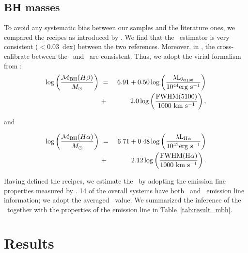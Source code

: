 \documentclass[apj]{emulateapj}
\begin{document}
\subsection{BH masses}
\label{mbh}
To avoid any systematic bias between our samples and the literature ones, we compared the recipes as introduced by \citet{Schulze2018, Ding2017b}. We find that the \hbeta\ estimator is very consistent ($<0.03$~dex) between the two references. Moreover, in \citet{Schulze2018}, the cross-calibrate between the \halpha\ and \hbeta\ are consistent. Thus, we adopt the virial formalism from \citet{Schulze2018}:
\begin{eqnarray}
\label{eq:Hb}
\log \left(\frac{\mathcal M_{\rm BH}(H\beta) }{M_{\odot}}\right)&~=~& 6.91+0.50\log \left(\frac{ \lambda \rm L _{\lambda_{5100}}}{10^{44}{\rm erg~s^{-1}}}\right) \nonumber\\
&~+~& 2.0 \log \left(\frac{\rm FWHM(5100)}{1000 ~{\rm km~s^{-1}}}\right) , 
\end {eqnarray}

and

\begin{eqnarray}
\label{eq:Ha}
\log \left(\frac{\mathcal M_{\rm BH} (H\alpha)}{M_{\odot}}\right)&~=~& 6.71+0.48 \log \left(\frac{ \lambda \rm L _{H\alpha}}{10^{42}{\rm erg~s^{-1}}}\right) \nonumber\\
&~+~& 2.12 \log \left(\frac{\rm FWHM(H\alpha)}{1000 ~{\rm km~s^{-1}}}\right).
\end {eqnarray}

Having defined the recipes, we estimate the \mbh\ by adopting the emission line properties measured by \citet{Schulze2018}. 14 of the overall systems have both \halpha\ and \hbeta\ emission line information; we adopt the averaged \mbh\ value. We summarized the inference of the \mbh\ together with the properties of the emission line in Table~\ref{tab:result_mbh}.


\section{Results}
\label{sec:result}
\end{document}

